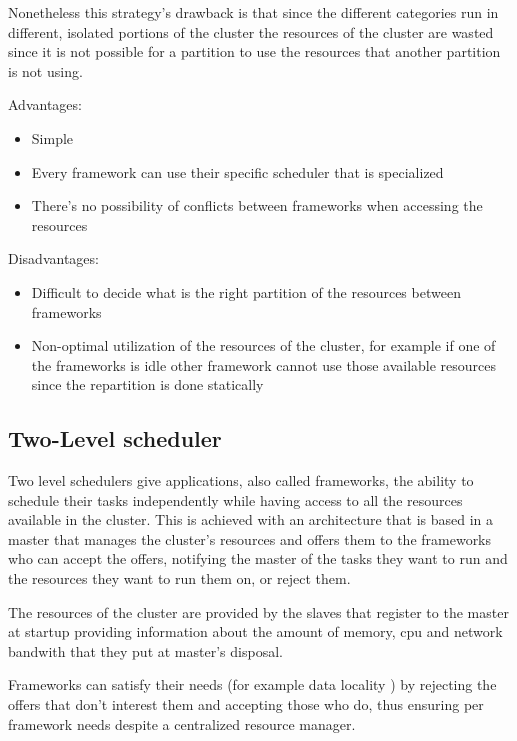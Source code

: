 \documentclass{svjour3}                     %
\begin{document}
Nonetheless this strategy's drawback is that since the different 
categories run in different, isolated portions of the cluster the
resources of the cluster are wasted since it is not possible for
a partition to use the resources that another partition is not using.

Advantages:

\begin{itemize}
    \item Simple
    \item Every framework can use their specific scheduler that is specialized
    \item There's no possibility of conflicts between frameworks when
      accessing the resources
\end{itemize}

Disadvantages:

\begin{itemize}
  \item Difficult to decide what is the right partition of the resources
between frameworks
  \item Non-optimal utilization of the resources of the cluster, for example
if one of the frameworks is idle other framework cannot use those
available resources since the repartition is done statically
\end{itemize}

\subsection{Two-Level scheduler}

Two level schedulers give applications, also called
frameworks, the ability to schedule their tasks independently while
having access to all the resources available in the cluster. This
is achieved with an architecture that is based in a master that manages
the cluster's resources and offers them to the frameworks who can accept 
the offers, notifying the master of the tasks they want to run and the
resources they want to run them on, or reject them.

The resources of the cluster are provided by the slaves that register to 
the master at startup providing information about the amount of memory, cpu
and network bandwith that they put at master's disposal.  

Frameworks can satisfy their needs (for example data locality \cite{chung_maximizing_2006} ) by 
rejecting the offers that don't interest them and accepting those who do, thus
ensuring per framework needs despite a centralized resource manager. 
\end{document}
